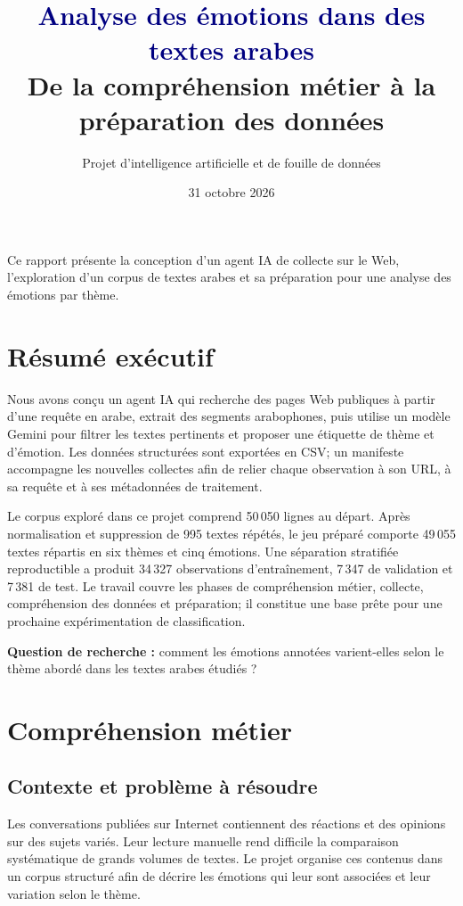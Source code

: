 \documentclass[11pt,a4paper]{article}
\title{\textcolor{navy}{Analyse des émotions dans des textes arabes}\\[5pt]
\large De la compréhension métier à la préparation des données}
\author{Projet d'intelligence artificielle et de fouille de données}
\date{31 octobre 2026}
\begin{document}
\maketitle
\vspace{-1.0em}
\begin{center}
\colorbox{pale}{\parbox{.92\linewidth}{\centering\small
Ce rapport présente la conception d'un agent IA de collecte sur le Web, l'exploration d'un corpus de textes arabes et sa préparation pour une analyse des émotions par thème.}}
\end{center}

\section*{Résumé exécutif}
Nous avons conçu un agent IA qui recherche des pages Web publiques à partir d'une requête en arabe, extrait des segments arabophones, puis utilise un modèle Gemini pour filtrer les textes pertinents et proposer une étiquette de thème et d'émotion. Les données structurées sont exportées en CSV; un manifeste accompagne les nouvelles collectes afin de relier chaque observation à son URL, à sa requête et à ses métadonnées de traitement.

Le corpus exploré dans ce projet comprend 50\,050 lignes au départ. Après normalisation et suppression de 995 textes répétés, le jeu préparé comporte 49\,055 textes répartis en six thèmes et cinq émotions. Une séparation stratifiée reproductible a produit 34\,327 observations d'entraînement, 7\,347 de validation et 7\,381 de test. Le travail couvre les phases de compréhension métier, collecte, compréhension des données et préparation; il constitue une base prête pour une prochaine expérimentation de classification.

\textbf{Question de recherche :} comment les émotions annotées varient-elles selon le thème abordé dans les textes arabes étudiés ?

\section{Compréhension métier}
\subsection{Contexte et problème à résoudre}
Les conversations publiées sur Internet contiennent des réactions et des opinions sur des sujets variés. Leur lecture manuelle rend difficile la comparaison systématique de grands volumes de textes. Le projet organise ces contenus dans un corpus structuré afin de décrire les émotions qui leur sont associées et leur variation selon le thème.
\end{document}
